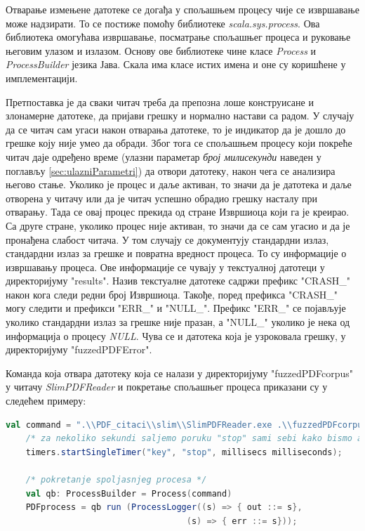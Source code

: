 \documentclass[12pt,oneside]{memoir}
\begin{document}
Отварање измењене датотеке се догађа у спољашњем процесу чије се извршавање може надзирати. То се постиже помоћу библиотеке \textit{scala.sys.process}. Ова библиотека омогућава извршавање, посматрање спољашњег процеса и руковање његовим улазом и излазом. Основу ове библиотеке чине класе \textit{Process} и \textit{ProcessBuilder} језика Јава. Скала има класе истих имена и оне су коришћене у имплементацији.

Претпоставка је да сваки читач треба да препозна лоше конструисане и злонамерне датотеке, да пријави грешку и нормално настави са радом. У случају да се читач сам угаси након отварања датотеке, то је индикатор да је дошло до грешке коју није умео да обради. Због тога се спољашњем процесу који покреће читач даје одређено време (улазни параметар \textit{број милисекунди} наведен у поглављу \ref{sec:ulazniParametri}) да отвори датотеку, након чега се анализира његово стање. Уколико је процес и даље активан, то значи да је датотека и даље отворена у читачу или да је читач успешно обрадио грешку насталу при отварању. Тада се овај процес прекида од стране Извршиоца који га је креирао. Са друге стране, уколико процес није активан, то значи да се сам угасио и да је пронађена слабост читача. У том случају се документују стандардни излаз, стандардни излаз за грешке и повратна вредност процеса. То су информације о извршавању процеса. Ове информације се чувају у текстуалној датотеци у директоријуму "results". Назив текстуалне датотеке садржи префикс "CRASH\_" након кога следи редни број Извршиоца. Такође, поред префикса "CRASH\_" могу следити и префикси "ERR\_" и "NULL\_". Префикс "ERR\_" се појављује уколико стандардни излаз за грешке није празан, а "NULL\_" уколико је нека од информација о процесу \textit{NULL}. Чува се и датотека која је узроковала грешку, у директоријуму "fuzzedPDFError".

Команда која отвара датотеку која се налази у директоријуму "fuzzedPDFcorpus" у читачу \textit{SlimPDFReader} и покретање спољашњег процеса приказани су у следећем примеру:

\begin{lstlisting}[frame=single, language=Scala]
    val command = ".\\PDF_citaci\\slim\\SlimPDFReader.exe .\\fuzzedPDFcorpus\\" + numberComplete +               "_fuzzed.pdf";
    /* za nekoliko sekundi saljemo poruku "stop" sami sebi kako bismo analizirali stanje procesa */
    timers.startSingleTimer("key", "stop", millisecs milliseconds);

    /* pokretanje spoljasnjeg procesa */
    val qb: ProcessBuilder = Process(command)
    PDFprocess = qb run (ProcessLogger((s) => { out ::= s},
	    					        (s) => { err ::= s}));
\end{lstlisting}
\end{document}
